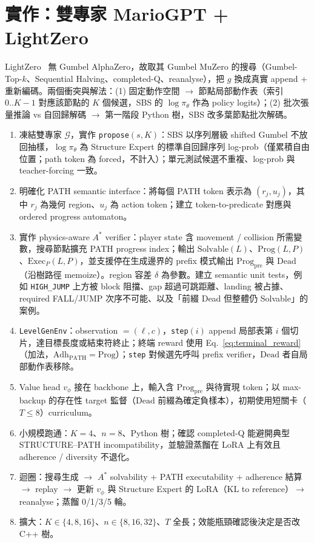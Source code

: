 \documentclass[11pt,a4paper]{article}
\newcommand{\Gp}{\mathcal{G}}
\newcommand{\lv}{\ell}
\newcommand{\cond}{c}
\begin{document}
\section{實作：雙專家 MarioGPT + LightZero}
LightZero~\cite{lightzero} 無 Gumbel AlphaZero，故取其 Gumbel MuZero 的搜尋（Gumbel-Top-$k$、Sequential Halving、completed-Q、reanalyse），把 $g$ 換成真實 append + 重新編碼。兩個衝突與解法：(1) 固定動作空間 $\to$ 節點局部動作表（索引 $0..K{-}1$ 對應該節點的 $K$ 個候選，SBS 的 $\log\pi_\theta$ 作為 policy logits）；(2) 批次張量推論 vs 自回歸解碼 $\to$ 第一階段 Python 樹，SBS 改多葉節點批次解碼。
\begin{enumerate}[label=\textbf{S\arabic*.}]
\item 凍結雙專家 $\Gp$，實作 \texttt{propose}$(s,K)$：SBS 以序列層級 shifted Gumbel 不放回抽樣，$\log\pi_\theta$ 為 Structure Expert 的標準自回歸序列 log-prob（僅累積自由位置；path token 為 forced，不計入）；單元測試候選不重複、log-prob 與 teacher-forcing 一致。
\item 明確化 PATH semantic interface：將每個 PATH token 表示為 $(r_j,u_j)$，其中 $r_j$ 為幾何 region、$u_j$ 為 action token；建立 token-to-predicate 對應與 ordered progress automaton。
\item 實作 physics-aware $A^*$ verifier：player state 含 movement / collision 所需變數，搜尋節點擴充 PATH progress index；輸出 $\mathrm{Solvable}(L)$、$\mathrm{Prog}(L,P)$、$\mathrm{Exec}_{P}(L,P)$，並支援停在生成邊界的 prefix 模式輸出 $\mathrm{Prog}_{\mathrm{pre}}$ 與 $\mathrm{Dead}$（沿樹路徑 memoize）。region 容差 $\delta$ 為參數。建立 semantic unit tests，例如 \texttt{HIGH\_JUMP} 上方被 block 阻擋、gap 超過可跳距離、landing 被占據、required FALL/JUMP 次序不可能、以及「前綴 Dead 但整體仍 Solvable」的案例。
\item \texttt{LevelGenEnv}：observation $=(\lv,\cond)$，\texttt{step}$(i)$ append 局部表第 $i$ 個切片，達目標長度或結束符終止；終端 reward 使用 Eq.~\eqref{eq:terminal_reward}（加法，$\mathrm{Adh}_{\mathrm{PATH}}=\mathrm{Prog}$）；\texttt{step} 對候選先呼叫 prefix verifier，$\mathrm{Dead}$ 者自局部動作表移除。
\item Value head $v_\phi$ 接在 backbone 上，輸入含 $\mathrm{Prog}_{\mathrm{pre}}$ 與待實現 token；以 max-backup 的存在性 target 監督（$\mathrm{Dead}$ 前綴為確定負樣本），初期使用短關卡（$T\le8$）curriculum。
\item 小規模跑通：$K=4$、$n=8$、Python 樹；確認 completed-Q 能避開典型 STRUCTURE--PATH incompatibility，並驗證蒸餾在 LoRA 上有效且 adherence / diversity 不退化。
\item 迴圈：搜尋生成 $\to$ $A^*$ solvability + PATH executability + adherence 結算 $\to$ replay $\to$ 更新 $v_\phi$ 與 Structure Expert 的 LoRA（KL to reference）$\to$ reanalyse；蒸餾 0/1/3/5 輪。
\item 擴大：$K\in\{4,8,16\}$、$n\in\{8,16,32\}$、$T$ 全長；效能瓶頸確認後決定是否改 C++ 樹。
\end{enumerate}
\end{document}
